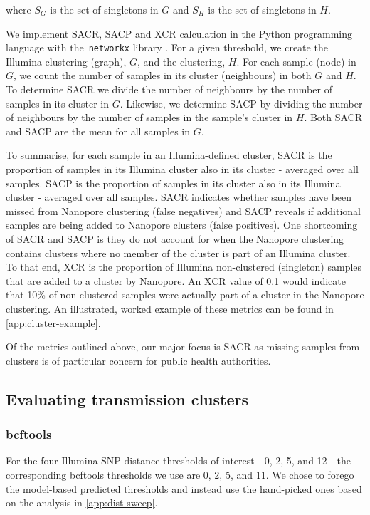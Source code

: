where $S_G$ is the set of singletons in $G$ and $S_H$ is the set of singletons in $H$.

We implement SACR, SACP and XCR calculation in the Python programming language with
the~\texttt{networkx} library \cite{networkx}. For a given threshold,
we create the Illumina clustering (graph), $G$, and the
\ont{} clustering, $H$. For each sample (node)
in $G$, we count the number of samples in its cluster
(neighbours) in both $G$ and $H$. To
determine SACR we divide the number of neighbours by the number of
samples in its cluster in $G$. Likewise, we determine
SACP by dividing the number of neighbours by the number of samples in
the sample's cluster in $H$. Both SACR and SACP are the
mean for all samples in $G$. 

To summarise, for each sample in an Illumina-defined cluster, SACR is the
proportion of samples in its Illumina cluster also in its \ont{}
cluster - averaged over all samples. SACP is the proportion of samples
in its \ont{} cluster also in its Illumina cluster - averaged
over all samples. SACR indicates whether samples have been missed from
Nanopore clustering (false negatives) and SACP reveals if additional
samples are being added to Nanopore clusters (false positives). One
shortcoming of SACR and SACP is they do not account for when the
Nanopore clustering contains clusters where no member of the cluster is
part of an Illumina cluster. To that end, XCR is the proportion of Illumina non-clustered
(singleton) samples that are added to a cluster by Nanopore. An XCR value of 0.1 would
indicate that 10\% of non-clustered samples were actually part of a
cluster in the Nanopore clustering. An illustrated, worked example of these metrics can be found in \autoref{app:cluster-example}.

Of the metrics outlined above, our major focus is SACR as missing samples from clusters is of particular concern for public health authorities.

\subsection{Evaluating \ont{} transmission clusters}

\subsubsection{bcftools}
\label{sec:bcftools-clustering}

For the four Illumina SNP distance thresholds of interest - 0, 2, 5, and 12 - the corresponding bcftools thresholds we use are 0, 2, 5, and 11. We chose to forego the model-based predicted thresholds and instead use the hand-picked ones based on the analysis in \autoref{app:dist-sweep}.

